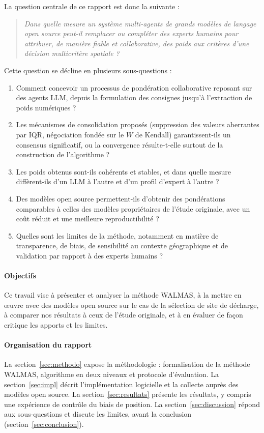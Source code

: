 \documentclass[11pt,a4paper]{article}
\begin{document}
La question centrale de ce rapport est donc la suivante :
\begin{quote}
\itshape Dans quelle mesure un système multi-agents de grands modèles de langage \textup{open source} peut-il remplacer ou compléter des experts humains pour attribuer, de manière fiable et collaborative, des poids aux critères d'une décision multicritère spatiale ?
\end{quote}

Cette question se décline en plusieurs sous-questions :
\begin{enumerate}[label=\arabic*.,leftmargin=*]
  \item\label{q1} Comment concevoir un processus de pondération collaborative reposant sur des agents LLM, depuis la formulation des consignes jusqu'à l'extraction de poids numériques ?
  \item\label{q2} Les mécanismes de consolidation proposés (suppression des valeurs aberrantes par IQR, négociation fondée sur le $W$ de Kendall) garantissent-ils un consensus significatif, ou la convergence résulte-t-elle surtout de la construction de l'algorithme ?
  \item\label{q3} Les poids obtenus sont-ils cohérents et stables, et dans quelle mesure diffèrent-ils d'un LLM à l'autre et d'un profil d'expert à l'autre ?
  \item\label{q4} Des modèles open source permettent-ils d'obtenir des pondérations comparables à celles des modèles propriétaires de l'étude originale, avec un coût réduit et une meilleure reproductibilité ?
  \item\label{q5} Quelles sont les limites de la méthode, notamment en matière de transparence, de biais, de sensibilité au contexte géographique et de validation par rapport à des experts humains ?
\end{enumerate}

\paragraph{Objectifs} Ce travail vise à présenter et analyser la méthode WALMAS, à la mettre en œuvre avec des modèles open source sur le cas de la sélection de site de décharge, à comparer nos résultats à ceux de l'étude originale, et à en évaluer de façon critique les apports et les limites.

\paragraph{Organisation du rapport} La section~\ref{sec:methodo} expose la méthodologie : formalisation de la méthode WALMAS, algorithme en deux niveaux et protocole d'évaluation. La section~\ref{sec:impl} décrit l'implémentation logicielle et la collecte auprès des modèles open source. La section~\ref{sec:resultats} présente les résultats, y compris une expérience de contrôle du biais de position. La section~\ref{sec:discussion} répond aux sous-questions et discute les limites, avant la conclusion (section~\ref{sec:conclusion}).
\end{document}
